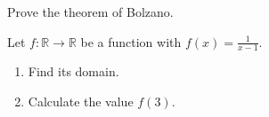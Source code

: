 \begin{schltask}
\item {}\par
  Prove the theorem of Bolzano.
\item {}\par
  Let $f:\mathbb{R}\rightarrow\mathbb{R}$ be a function with $f(x) = \frac1{x-1}$.
  \begin{enumerate}
  \item {} Find its domain.
  \item {} Calculate the value $f(3)$.
  \end{enumerate}
\end{schltask}
